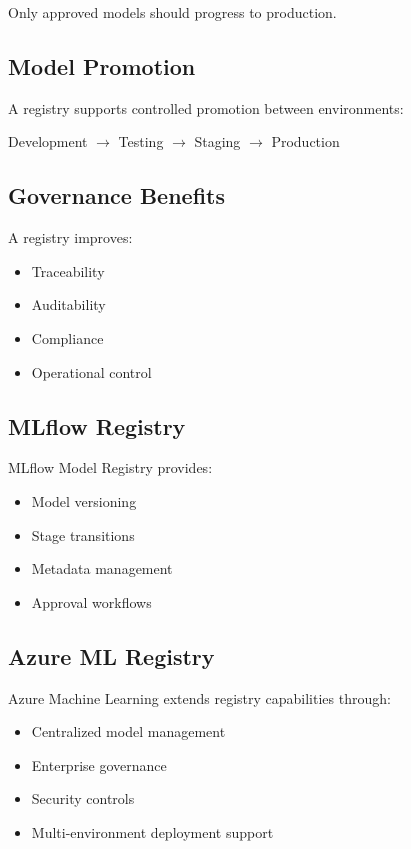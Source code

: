 Only approved models should progress to production.

\subsection{Model Promotion}

A registry supports controlled promotion between environments:

\begin{center}
Development
$\rightarrow$
Testing
$\rightarrow$
Staging
$\rightarrow$
Production
\end{center}

\subsection{Governance Benefits}

A registry improves:

\begin{itemize}
    \item Traceability
    \item Auditability
    \item Compliance
    \item Operational control
\end{itemize}

\subsection{MLflow Registry}

MLflow Model Registry provides:

\begin{itemize}
    \item Model versioning
    \item Stage transitions
    \item Metadata management
    \item Approval workflows
\end{itemize}

\subsection{Azure ML Registry}

Azure Machine Learning extends registry capabilities through:

\begin{itemize}
    \item Centralized model management
    \item Enterprise governance
    \item Security controls
    \item Multi-environment deployment support
\end{itemize}

